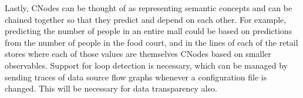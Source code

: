 Lastly, CNodes can be thought of as representing semantic concepts and can be
chained together so that they predict and depend on each other.  For example,
predicting the number of
people in an entire mall could be based on predictions from the number of people in the food court,
and in the lines of each of the retail stores where each of those values are
themselves CNodes based on smaller observables.  Support for loop detection is
necessary, which can be managed by sending traces of data source flow graphs whenever
a configuration file is changed.  This will be necessary for data transparency
also.



